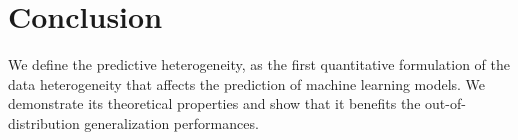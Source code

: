\section{Conclusion}
We define the predictive heterogeneity, as the first quantitative formulation of the data heterogeneity that affects the prediction of machine learning models.
We demonstrate its theoretical properties and show that it benefits the out-of-distribution generalization performances.
